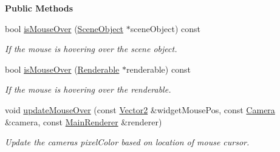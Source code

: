 \begin{Indent}\textbf{ Public Methods}\par
\begin{DoxyCompactItemize}
\item 
\mbox{\label{classrev_1_1_mouse_picker_a960536c49e478b469009ba97e2c50f86}} 
bool \mbox{\hyperlink{classrev_1_1_mouse_picker_a960536c49e478b469009ba97e2c50f86}{is\+Mouse\+Over}} (\mbox{\hyperlink{classrev_1_1_scene_object}{Scene\+Object}} $\ast$scene\+Object) const
\begin{DoxyCompactList}\small\item\em If the mouse is hovering over the scene object. \end{DoxyCompactList}\item 
\mbox{\label{classrev_1_1_mouse_picker_a95b7b887e5e467a15992df531e123713}} 
bool \mbox{\hyperlink{classrev_1_1_mouse_picker_a95b7b887e5e467a15992df531e123713}{is\+Mouse\+Over}} (\mbox{\hyperlink{classrev_1_1_renderable}{Renderable}} $\ast$renderable) const
\begin{DoxyCompactList}\small\item\em If the mouse is hovering over the renderable. \end{DoxyCompactList}\item 
\mbox{\label{classrev_1_1_mouse_picker_aa79df0676626723ebb352b7b715c885e}} 
void \mbox{\hyperlink{classrev_1_1_mouse_picker_aa79df0676626723ebb352b7b715c885e}{update\+Mouse\+Over}} (const \mbox{\hyperlink{classrev_1_1_vector}{Vector2}} \&widget\+Mouse\+Pos, const \mbox{\hyperlink{classrev_1_1_camera}{Camera}} \&camera, const \mbox{\hyperlink{classrev_1_1_main_renderer}{Main\+Renderer}} \&renderer)
\begin{DoxyCompactList}\small\item\em Update the camera\textquotesingle{}s pixel\+Color based on location of mouse cursor. \end{DoxyCompactList}\end{DoxyCompactItemize}
\end{Indent}
